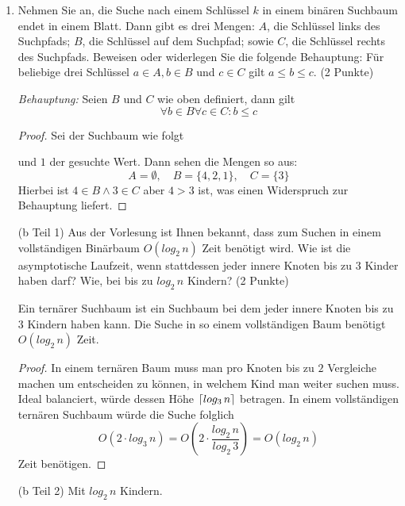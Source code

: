 \documentclass[ngerman,landscape,twocolumn]{adtexsheet}
\DeclarePairedDelimiter\ceil{\lceil}{\rceil}
\begin{document}
\begin{question}
    \begin{enumerate}
        \item Nehmen Sie an, die Suche nach einem Schlüssel $k$ in einem binären Suchbaum endet in einem Blatt. Dann gibt es drei Mengen: $A$, die Schlüssel links des Suchpfads; $B$, die Schlüssel auf dem Suchpfad; sowie $C$, die Schlüssel rechts des Suchpfads. Beweisen oder widerlegen Sie die folgende Behauptung: Für beliebige drei Schlüssel $a \in A, b \in B$ und $c \in C$ gilt $a \leq b \leq c$. (2 Punkte)
        
        \emph{Behauptung:} Seien $B$ und $C$ wie oben definiert, dann gilt $$\forall b \in B \forall c \in C: b \leq c$$
        \begin{proof} Sei der Suchbaum wie folgt
        \begin{center}
        \end{center}
        und $1$ der gesuchte Wert. Dann sehen die Mengen so aus: $$A=\emptyset, \quad B=\{4,2,1\}, \quad C=\{3\}$$ Hierbei ist $4 \in B \land 3 \in C$ aber $4 > 3$ ist, was einen Widerspruch zur Behauptung liefert.
        \end{proof}
        
        \item[(b Teil 1)] Aus der Vorlesung ist Ihnen bekannt, dass zum Suchen in einem vollständigen Binärbaum $O(log_2\,n)$ Zeit benötigt wird. Wie ist die asymptotische Laufzeit, wenn stattdessen jeder innere Knoten bis zu $3$ Kinder haben darf? Wie, bei bis zu $log_2\,n$ Kindern? (2 Punkte)
        \begin{behauptung}
        Ein ternärer Suchbaum ist ein Suchbaum bei dem jeder innere Knoten bis zu $3$ Kindern haben kann. Die Suche in so einem vollständigen Baum benötigt $O(log_2\, n)$ Zeit.
        \end{behauptung}
        \begin{proof}
        In einem ternären Baum muss man pro Knoten bis zu $2$ Vergleiche machen um entscheiden zu können, in welchem Kind man weiter suchen muss. Ideal balanciert, würde dessen Höhe $\ceil*{log_3\,n}$ betragen. In einem vollständigen ternären Suchbaum würde die Suche folglich
\[
O(2 \cdot log_3\,n) = O\left(2 \cdot \frac{log_2\, n}{log_2\, 3}\right) = O(log_2\, n)
\]
        Zeit benötigen.
        \end{proof}
        \item[(b Teil 2)] Mit $log_2\, n$ Kindern.
        

\end{enumerate}
\end{question}
\end{document}
